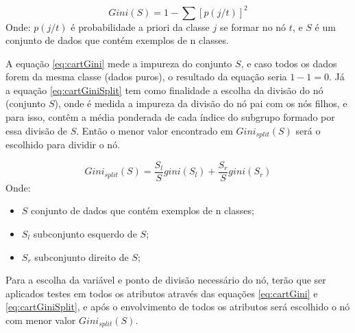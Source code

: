 \begin{equation}
Gini(S)= 1 - \sum [p(j/t)]^2
 \label{eq:cartGini}
\end{equation}
Onde: ${p(j/t)}$ é probabilidade a priori da classe ${j}$ se formar no nó ${t}$, e ${S}$ é um conjunto de dados que contém exemplos de n classes.

A equação \ref{eq:cartGini} mede a impureza do conjunto ${S}$, e caso todos os dados forem da mesma classe (dados puros), o resultado da equação seria ${1-1=0}$. Já a equação \ref{eq:cartGiniSplit} tem como  finalidade a escolha da divisão do nó (conjunto ${S}$), onde é medida a impureza da divisão do nó pai com os nós filhos, e para isso, contêm a média ponderada de cada índice do subgrupo formado por essa divisão de ${S}$. Então o menor valor encontrado em ${Gini_{split}(S)}$ será o escolhido para dividir o nó. 

\begin{equation}
Gini_{split}(S) = \frac{S_l}{S}gini(S_l)+\frac{S_r}{S}gini(S_r)
 \label{eq:cartGiniSplit}
\end{equation}
Onde:
\begin{itemize}[noitemsep]
            \item ${S}$ conjunto de dados que contém exemplos de n classes;
            \item ${S_l}$ subconjunto esquerdo de ${S}$;
            \item ${S_r}$ subconjunto direito de ${S}$;
        \end{itemize}

Para a escolha da variável e ponto de divisão necessário do nó, terão que ser aplicados testes em todos os atributos através das equações \ref{eq:cartGini} e \ref{eq:cartGiniSplit}, e após o envolvimento de todos os atributos será escolhido o nó com menor valor ${Gini_{split}(S)}$.



